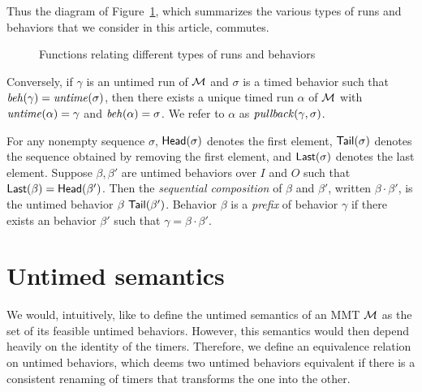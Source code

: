 Thus the diagram of Figure~\ref{fig:diagram}, which summarizes the various types of runs and behaviors that we consider
in this article, commutes.
\begin{figure}[h]
\centering
{}
\caption{Functions relating different types of runs and behaviors}
\label{fig:diagram}
\end{figure}
\fi
Conversely, if $\gamma$ is an untimed run  of ${\cal M}$ and $\sigma$ is a timed behavior such that $\mathit{beh}(\gamma) = \mathit{untime}(\sigma)$,
then there exists a unique timed run $\alpha$ of ${\cal M}$ with $\mathit{untime}(\alpha) = \gamma$ and $\mathit{beh}(\alpha) = \sigma$.
We refer to $\alpha$ as $\mathit{pullback}(\gamma,\sigma)$.

For any nonempty sequence $\sigma$, $\mathsf{Head}({\sigma})$ denotes the first element, $\mathsf{Tail}({\sigma})$ denotes the sequence obtained by removing the first element, and $\mathsf{Last}({\sigma})$ denotes the last element.
Suppose $\beta, \beta'$ are untimed behaviors over $I$ and $O$ such that $\mathsf{Last}({\beta}) = \mathsf{Head}({\beta'})$.
Then the \emph{sequential composition} of $\beta$ and $\beta'$, written $\beta \cdot \beta'$, is the untimed behavior $\beta ~ \mathsf{Tail}({\beta'})$.
Behavior $\beta$ is a \emph{prefix} of behavior $\gamma$ if there exists an behavior $\beta'$ such that $\gamma = \beta \cdot \beta'$.

\section{Untimed semantics}
\label{section untimed semantics}
We would, intuitively, like to define the untimed semantics of an MMT ${\cal M}$ as the set of its feasible untimed behaviors.
However, this semantics would then depend heavily on the identity of the timers. Therefore, we define an equivalence relation
on untimed behaviors, which deems two untimed behaviors equivalent if there is a consistent renaming of timers that transforms
the one into the other.

